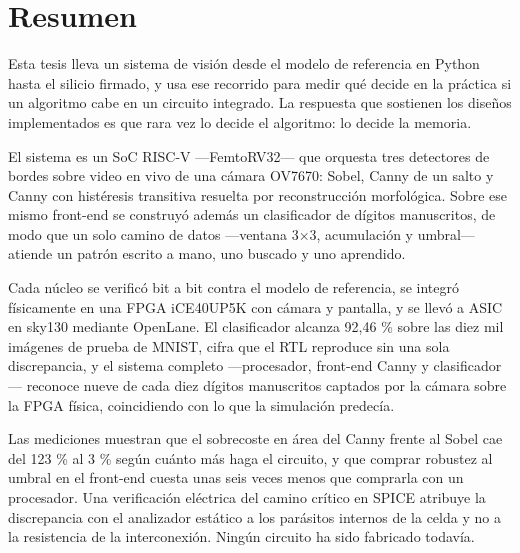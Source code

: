 %
%

\maketitle

{
\setcounter{tocdepth}{3}
\tableofcontents
}
\newpage

\chapter{Resumen}\label{resumen}

Esta tesis lleva un sistema de visión desde el modelo de referencia en
Python hasta el silicio firmado, y usa ese recorrido para medir qué
decide en la práctica si un algoritmo cabe en un circuito integrado. La
respuesta que sostienen los diseños implementados es que rara vez lo
decide el algoritmo: lo decide la memoria.

El sistema es un SoC RISC-V ---FemtoRV32--- que orquesta tres detectores
de bordes sobre video en vivo de una cámara OV7670: Sobel, Canny de un
salto y Canny con histéresis transitiva resuelta por reconstrucción
morfológica. Sobre ese mismo front-end se construyó además un
clasificador de dígitos manuscritos, de modo que un solo camino de datos
---ventana 3×3, acumulación y umbral--- atiende un patrón escrito a
mano, uno buscado y uno aprendido.

Cada núcleo se verificó bit a bit contra el modelo de referencia, se
integró físicamente en una FPGA iCE40UP5K con cámara y pantalla, y se
llevó a ASIC en sky130 mediante OpenLane. El clasificador alcanza 92,46
\% sobre las diez mil imágenes de prueba de MNIST, cifra que el RTL
reproduce sin una sola discrepancia, y el sistema completo
---procesador, front-end Canny y clasificador--- reconoce nueve de cada
diez dígitos manuscritos captados por la cámara sobre la FPGA física,
coincidiendo con lo que la simulación predecía.

Las mediciones muestran que el sobrecoste en área del Canny frente al
Sobel cae del 123 \% al 3 \% según cuánto más haga el circuito, y que
comprar robustez al umbral en el front-end cuesta unas seis veces menos
que comprarla con un procesador. Una verificación eléctrica del camino
crítico en SPICE atribuye la discrepancia con el analizador estático a
los parásitos internos de la celda y no a la resistencia de la
interconexión. Ningún circuito ha sido fabricado todavía.

